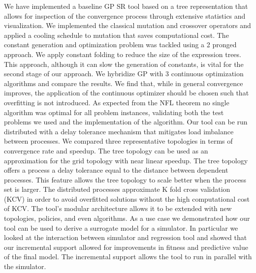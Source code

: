 
We have implemented a baseline GP SR tool based on a tree representation that allows for inspection of the convergence process through extensive statistics and visualization. We implemented the classical mutation and crossover operators and applied a cooling schedule to mutation that saves computational cost. 
The constant generation and optimization problem was tackled using a 2 pronged approach. We apply constant folding to reduce the size of the expression trees. This approach, although it can slow the generation of constants, is vital for the second stage of our approach. We hybridize GP with 3 continuous optimization algorithms and compare the results. We find that, while in general convergence improves, the application of the continuous optimizer should be chosen such that overfitting is not introduced.
As expected from the NFL theorem no single algorithm was optimal for all problem instances, validating both the test problems we used and the implementation of the algorithm.
Our tool can be run distributed with a delay tolerance mechanism that mitigates load imbalance between processes. We compared three representative topologies in terms of convergence rate and speedup. The tree topology can be used as an approximation for the grid topology with near linear speedup. The tree topology offers a process a delay tolerance equal to the distance between dependent processes. This feature allows the tree topology to scale better when the process set is larger. 
The distributed processes approximate K fold cross validation (KCV) in order to avoid overfitted solutions without the high computational cost of KCV. 
The tool's modular architecture allows it to be extended with new topologies, policies, and even algorithms. 
As a use case we demonstrated how our tool can be used to derive a surrogate model for a simulator. In particular we looked at the interaction between simulator and regression tool and showed that our incremental support allowed for improvements in fitness and predictive value of the final model. The incremental support allows the tool to run in parallel with the simulator.
